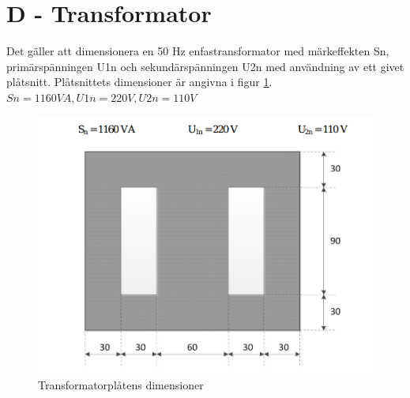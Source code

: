 \documentclass{article}
\begin{document}
\section{D - Transformator}
Det gäller att dimensionera en 50 Hz enfastransformator med märkeffekten Sn, primärspänningen
U1n och sekundärspänningen U2n med användning av ett givet plåtsnitt. Plåtsnittets dimensioner
är angivna i figur \ref{fig:trafo}.
$Sn = 1160 VA, U1n = 220 V,U2n = 110 V$


 \begin{figure}[H]
 \begin{center}
 \includegraphics[width=1\textwidth]{img/transformatorplat.png} %
 \caption{Transformatorplåtens dimensioner}
 \label{fig:trafo}
 \end{center}
 \end{figure}
\end{document}
